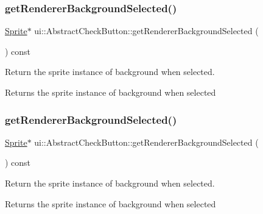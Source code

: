 \subsubsection{\texorpdfstring{get\+Renderer\+Background\+Selected()}{getRendererBackgroundSelected()}\hspace{0.1cm}{\footnotesize\ttfamily [1/2]}}
{\footnotesize\ttfamily \hyperlink{classSprite}{Sprite}$\ast$ ui\+::\+Abstract\+Check\+Button\+::get\+Renderer\+Background\+Selected (\begin{DoxyParamCaption}{ }\end{DoxyParamCaption}) const\hspace{0.3cm}{\ttfamily [inline]}}



Return the sprite instance of background when selected. 

\begin{DoxyReturn}{Returns}
the sprite instance of background when selected 
\end{DoxyReturn}
\mbox{\label{classui_1_1AbstractCheckButton_a1ba602c981e86948cc82b020f8e94958}} 
\subsubsection{\texorpdfstring{get\+Renderer\+Background\+Selected()}{getRendererBackgroundSelected()}\hspace{0.1cm}{\footnotesize\ttfamily [2/2]}}
{\footnotesize\ttfamily \hyperlink{classSprite}{Sprite}$\ast$ ui\+::\+Abstract\+Check\+Button\+::get\+Renderer\+Background\+Selected (\begin{DoxyParamCaption}{ }\end{DoxyParamCaption}) const\hspace{0.3cm}{\ttfamily [inline]}}



Return the sprite instance of background when selected. 

\begin{DoxyReturn}{Returns}
the sprite instance of background when selected 
\end{DoxyReturn}
\mbox{\label{classui_1_1AbstractCheckButton_a6527e80f91a37299249d5b95e6d32a17}} 
